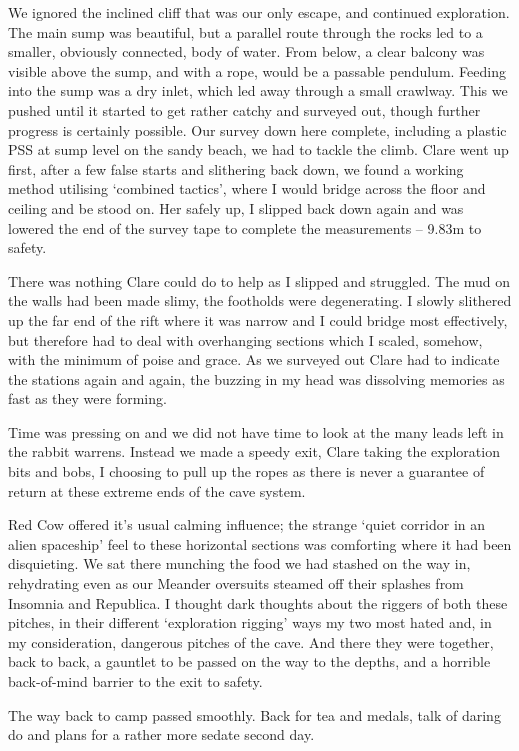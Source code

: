 We ignored the inclined cliff that was our only escape, and continued
exploration. The main sump was beautiful, but a parallel route through
the rocks led to a smaller, obviously connected, body of water. From
below, a clear balcony was visible above the sump, and with a rope,
would be a passable pendulum. Feeding into the sump was a dry inlet,
which led away through a small crawlway. This we pushed until it started
to get rather catchy and surveyed out, though further progress is
certainly possible. Our survey down here complete, including a plastic
PSS at sump level on the sandy beach, we had to tackle the climb. Clare
went up first, after a few false starts and slithering back down, we
found a working method utilising `combined tactics', where I would
bridge across the floor and ceiling and be stood on. Her safely up, I
slipped back down again and was lowered the end of the survey tape to
complete the measurements -- 9.83m to safety.

There was nothing Clare could do to help as I slipped and struggled. The
mud on the walls had been made slimy, the footholds were degenerating. I
slowly slithered up the far end of the rift where it was narrow and I
could bridge most effectively, but therefore had to deal with
overhanging sections which I scaled, somehow, with the minimum of poise
and grace. As we surveyed out Clare had to indicate the stations again
and again, the buzzing in my head was dissolving memories as fast as
they were forming.

Time was pressing on and we did not have time to look at the many leads
left in the rabbit warrens. Instead we made a speedy exit, Clare taking
the exploration bits and bobs, I choosing to pull up the ropes as there
is never a guarantee of return at these extreme ends of the cave system.

Red Cow offered it's usual calming influence; the strange `quiet
corridor in an alien spaceship' feel to these horizontal sections was
comforting where it had been disquieting. We sat there munching the food
we had stashed on the way in, rehydrating even as our Meander oversuits
steamed off their splashes from Insomnia and Republica. I thought dark
thoughts about the riggers of both these pitches, in their different
`exploration rigging' ways my two most hated and, in my consideration,
dangerous pitches of the cave. And there they were together, back to
back, a gauntlet to be passed on the way to the depths, and a horrible
back-of-mind barrier to the exit to safety.

The way back to camp passed smoothly. Back for tea and medals, talk of
daring do and plans for a rather more sedate second day.

